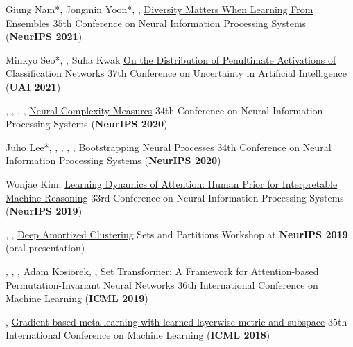 \cvpub
{Giung Nam*, Jongmin Yoon*, \me, \ljh}
{\href{https://arxiv.org/abs/2110.14149}{Diversity Matters When Learning From Ensembles}}
{$35$th Conference on Neural Information Processing Systems
(\textbf{NeurIPS 2021})}

\cvpub
{Minkyo Seo*, \meeq, Suha Kwak}
{\href{https://arxiv.org/abs/2107.01900}{On the Distribution of Penultimate Activations of Classification Networks}}
{$37$th Conference on Uncertainty in Artificial Intelligence (\textbf{UAI 2021})}

\cvpub
{\me, \ljh, \sjh, \ehy, \sjc}
{\href{https://arxiv.org/abs/2008.02953}
  {Neural Complexity Measures}}
{$34$th Conference on Neural Information Processing Systems
(\textbf{NeurIPS 2020})}

\cvpub
{Juho Lee*, \meeq, \jtk, \ehy, \sjh, \ywt}
{\href{https://arxiv.org/abs/2008.02956}
  {Bootstrapping Neural Processes}}
{$34$th Conference on Neural Information Processing Systems
(\textbf{NeurIPS 2020})}

\cvpub
{Wonjae Kim, \me}
{\href{https://papers.nips.cc/paper/8835-learning-dynamics-of-attention-human-prior-for-interpretable-machine-reasoning.pdf}
  {Learning Dynamics of Attention: Human Prior for Interpretable Machine Reasoning}}
{$33$rd Conference on Neural Information Processing Systems
(\textbf{NeurIPS 2019})}

\cvpub
{\ljh, \me, \ywt}
{\href{https://arxiv.org/abs/1909.13433}
  {Deep Amortized Clustering} }
{Sets and Partitions Workshop at \textbf{NeurIPS 2019} (oral presentation)}

\cvpub
{\ljh, \me, \jtk, Adam Kosiorek, \sjc, \ywt}
{\href{http://proceedings.mlr.press/v97/lee19d/lee19d.pdf}
  {Set Transformer: A Framework for Attention-based Permutation-Invariant Neural Networks}}
{$36$th International Conference on Machine Learning
(\textbf{ICML 2019})}

\cvpub
{\me \hspace{1pt}, \sjc}
{\href{http://proceedings.mlr.press/v80/lee18a/lee18a.pdf}    
  {Gradient-based meta-learning with learned layerwise metric and subspace}}
{$35$th International Conference on Machine Learning
(\textbf{ICML 2018})}


